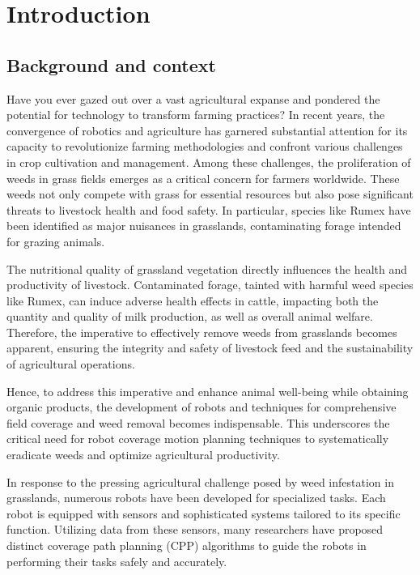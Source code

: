 \chapter{Introduction}


\section{Background and context}


Have you ever gazed out over a vast agricultural expanse and pondered the potential for technology to transform farming practices? In recent years, the convergence of robotics and agriculture has garnered substantial attention for its capacity to revolutionize farming methodologies and confront various challenges in crop cultivation and management. Among these challenges, the proliferation of weeds in grass fields emerges as a critical concern for farmers worldwide. These weeds not only compete with grass for essential resources but also pose significant threats to livestock health and food safety. In particular, species like Rumex have been identified as major nuisances in grasslands, contaminating forage intended for grazing animals.

\vspace*{3mm} 

The nutritional quality of grassland vegetation directly influences the health and productivity of livestock. Contaminated forage, tainted with harmful weed species like Rumex, can induce adverse health effects in cattle, impacting both the quantity and quality of milk production, as well as overall animal welfare. Therefore, the imperative to effectively remove weeds from grasslands becomes apparent, ensuring the integrity and safety of livestock feed and the sustainability of agricultural operations.

\vspace*{3mm} 

Hence, to address this imperative and enhance animal well-being while obtaining organic products, the development of robots and techniques for comprehensive field coverage and weed removal becomes indispensable. This underscores the critical need for robot coverage motion planning techniques to systematically eradicate weeds and optimize agricultural productivity.

\vspace*{3mm} 


In response to the pressing agricultural challenge posed by weed infestation in grasslands, numerous robots have been developed for specialized tasks. Each robot is equipped with sensors and sophisticated systems tailored to its specific function. Utilizing data from these sensors, many researchers have proposed distinct coverage path planning (CPP) algorithms to guide the robots in performing their tasks safely and accurately. 

